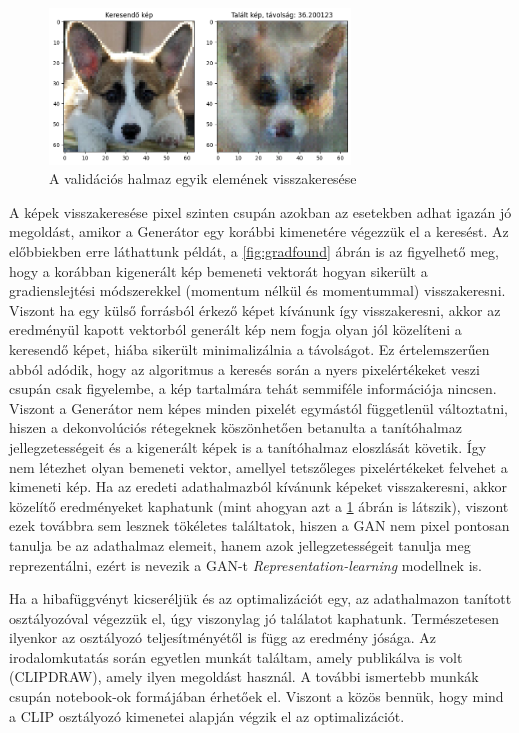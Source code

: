 \begin{figure}[h]
	\centering
	\includegraphics[width=8cm]{images/grad_search_val_image.png}
	\caption{A validációs halmaz egyik elemének visszakeresése}
	\label{fig:gradval}
\end{figure}



A képek visszakeresése pixel szinten csupán azokban az esetekben adhat igazán jó megoldást, amikor a Generátor egy korábbi kimenetére végezzük el a keresést. Az előbbiekben erre láthattunk példát, a \ref{fig:gradfound} ábrán is az figyelhető meg, hogy a korábban kigenerált kép bemeneti vektorát hogyan sikerült a gradienslejtési módszerekkel (momentum nélkül és momentummal) visszakeresni.
Viszont ha egy külső forrásból érkező képet kívánunk így visszakeresni, akkor az eredményül kapott vektorból generált kép nem fogja olyan jól közelíteni a keresendő képet, hiába sikerült minimalizálnia a távolságot.
Ez értelemszerűen abból adódik, hogy az algoritmus a keresés során a nyers pixelértékeket veszi csupán csak figyelembe, a kép tartalmára tehát semmiféle információja nincsen. Viszont a Generátor nem képes minden pixelét egymástól függetlenül változtatni, hiszen a dekonvolúciós rétegeknek köszönhetően betanulta a tanítóhalmaz jellegzetességeit és a kigenerált képek is a tanítóhalmaz eloszlását követik. Így nem létezhet olyan bemeneti vektor, amellyel tetszőleges pixelértékeket felvehet a kimeneti kép.
Ha az eredeti adathalmazból  kívánunk képeket visszakeresni, akkor közelítő eredményeket kaphatunk (mint ahogyan azt a \ref{fig:gradval} ábrán is látszik), viszont ezek továbbra sem lesznek tökéletes találtatok, hiszen a GAN nem pixel pontosan tanulja be az adathalmaz elemeit, hanem azok jellegzetességeit tanulja meg reprezentálni, ezért is nevezik a GAN-t \textit{Representation-learning} \cite{geron2019hands} modellnek is.

Ha a hibafüggvényt kicseréljük és az optimalizációt egy, az adathalmazon tanított osztályozóval végezzük el, úgy viszonylag jó találatot kaphatunk. Természetesen ilyenkor az osztályozó teljesítményétől is függ az eredmény jósága.
Az irodalomkutatás során egyetlen munkát találtam, amely publikálva is volt (CLIPDRAW\cite{frans2021clipdraw}), amely ilyen megoldást használ. A további ismertebb munkák csupán notebook-ok formájában érhetőek el. Viszont a közös bennük, hogy mind a CLIP\cite{radford2021learning} osztályozó kimenetei alapján végzik el az optimalizációt.

